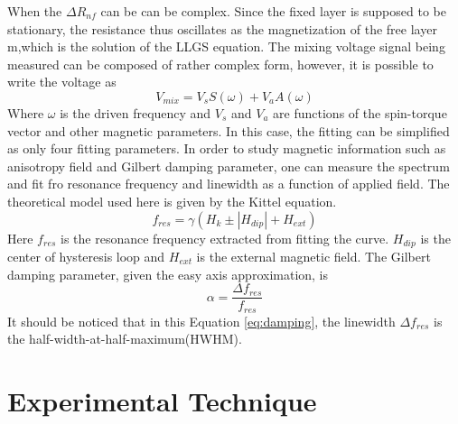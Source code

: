 When the $\Delta R_{nf}$ can be can be complex. Since the fixed layer is supposed to be stationary, the resistance thus oscillates as the magnetization of the free layer m,which is the solution of the LLGS equation. The mixing voltage signal being measured can be composed of rather complex form, however, it is possible to write the voltage as
\begin{equation}\label{eq:FMR}
V_{mix} = V_{s}S(\omega) + V_{a}A(\omega)
\end{equation}
Where $\omega$ is the driven frequency and $V_{s}$ and $V_{a}$ are functions of the spin-torque vector and other magnetic parameters. In this case, the fitting can be simplified as only four fitting parameters. In order to study magnetic information such as anisotropy field and Gilbert damping parameter, one can measure the spectrum and fit fro resonance frequency and linewidth as a function of applied field. The theoretical model used here is given by the Kittel equation\cite{Kittel}.
\begin{equation}\label{eq:Kittel}
f_{res} = \gamma(H_{k} \pm |H_{dip}| + H_{ext})
\end{equation}
Here $f_{res}$ is the resonance frequency extracted from fitting the curve. $H_{dip}$ is the center of hysteresis loop and $H_{ext}$ is the external magnetic field. The Gilbert damping parameter, given the easy axis approximation, is 
\begin{equation}\label{eq:damping}
\alpha = \frac{\Delta f_{res}}{f_{res}}
\end{equation}
It should be noticed that in this Equation \ref{eq:damping}, the linewidth $\Delta f_{res}$ is the half-width-at-half-maximum(HWHM).


\section{Experimental Technique}

